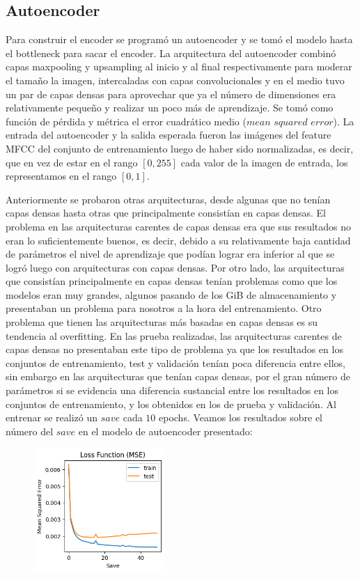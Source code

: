 \documentclass[colorinlistoftodos,twoside,twocolumn,10pt]{article} %
\begin{document}
\subsection{Autoencoder}
Para construir el encoder se programó un autoencoder y se tomó el modelo hasta el bottleneck para sacar el encoder. La arquitectura del autoencoder combinó capas maxpooling y upsampling al inicio y al final respectivamente para moderar el tamaño la imagen, intercaladas con capas convolucionales y en el medio tuvo un par de capas densas para aprovechar que ya el número de dimensiones era relativamente pequeño y realizar un poco más de aprendizaje. Se tomó como función de pérdida y métrica el error cuadrático medio ($\textit{mean squared error}$). La entrada del autoencoder y la salida esperada fueron las imágenes del feature MFCC del conjunto de entrenamiento luego de haber sido normalizadas, es decir, que en vez de estar en el rango $[0, 255]$ cada valor de la imagen de entrada, los representamos en el rango $[0, 1]$. 

Anteriormente se probaron otras arquitecturas, desde algunas que no tenían capas densas hasta otras que principalmente consistían en capas densas. El problema en las arquitecturas carentes de capas densas era que sus resultados no eran lo suficientemente buenos, es decir, debido a su relativamente baja cantidad de parámetros el nivel de aprendizaje que podían lograr era inferior al que se logró luego con arquitecturas con capas densas. Por otro lado, las arquitecturas que consistían principalmente en capas densas tenían problemas como que los modelos eran muy grandes, algunos pasando de los GiB de almacenamiento y presentaban un problema para nosotros a la hora del entrenamiento. Otro problema que tienen las arquitecturas más basadas en capas densas es su tendencia al overfitting. En las prueba realizadas, las arquitecturas carentes de capas densas no presentaban este tipo de problema ya que los resultados en los conjuntos de entrenamiento, test y validación tenían poca diferencia entre ellos, sin embargo en las arquitecturas que tenían capas densas, por el gran número de parámetros si se evidencia una diferencia sustancial entre los resultados en los conjuntos de entrenamiento, y los obtenidos en los de prueba y validación. Al entrenar se realizó un $save$ cada $10$ epochs. Veamos los resultados sobre el número del $save$ en el modelo de autoencoder presentado:

\begin{figure}[h!]
	\includegraphics[width=5cm]{overfitting_graph.png}
\end{figure}
\end{document}
